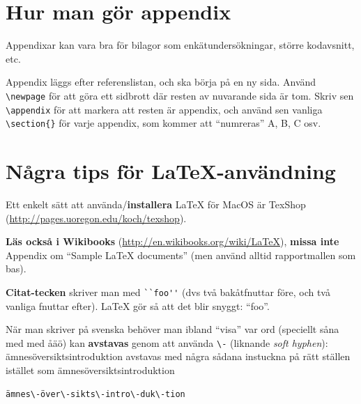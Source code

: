 \documentclass[a4paper,12pt]{article}
\begin{document}

%

\newpage
\appendix %
\section{Hur man gör appendix}
Appendixar kan vara bra för bilagor som enkätundersökningar, större kodavsnitt, etc. 

Appendix läggs efter referenslistan, och ska börja på en ny sida. Använd \verb|\newpage| för att göra ett sidbrott där resten av nuvarande sida är tom. Skriv sen \verb|\appendix| för att markera att resten är appendix, och 
 använd sen vanliga \verb|\section{}| för varje appendix, som kommer att ``numreras'' A, B, C osv.

\section{Några tips för La\TeX-användning}

Ett enkelt sätt att använda/\textbf{installera} LaTeX för MacOS är TexShop (\url{http://pages.uoregon.edu/koch/texshop}).

\textbf{Läs också i Wikibooks} (\url{http://en.wikibooks.org/wiki/LaTeX}), \textbf{missa inte} Appendix om ``Sample LaTeX documents'' (men använd alltid rapportmallen som bas).

\textbf{Citat-tecken} skriver man med \verb|``foo''| (dvs två bakåtfnuttar före, och två vanliga fnuttar efter). LaTeX gör så att det blir snyggt: ``foo''.

När man skriver på svenska behöver man ibland ``visa'' var ord (speciellt såna med med åäö) kan \textbf{avstavas} genom att använda \verb|\-| (liknande \textit{soft hyphen}): ämnesöversiktsintroduktion avstavas med några sådana instuckna på rätt ställen istället som ämnes\-över\-sikts\-intro\-duk\-tion

\begin{verbatim}
ämnes\-över\-sikts\-intro\-duk\-tion
\end{verbatim}
\end{document}
